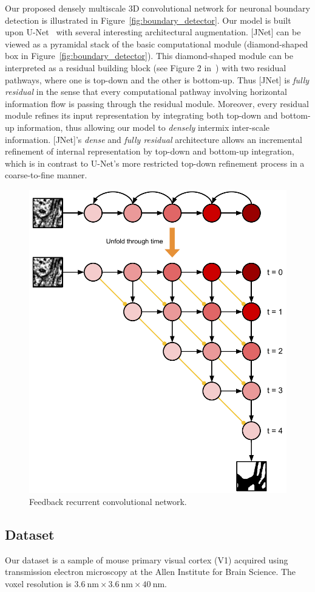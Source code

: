 \documentclass{article}
\begin{document}
\begin{appendices}
Our proposed densely multiscale 3D convolutional network for neuronal boundary
detection is illustrated in Figure~\ref{fig:boundary_detector}. Our model is
built upon U-Net~\cite{unet} with several interesting architectural
augmentation. [JNet] can be viewed as a pyramidal stack of the basic
computational module (diamond-shaped box in Figure~\ref{fig:boundary_detector}).
This diamond-shaped module can be interpreted as a residual building block (see
Figure 2 in~\cite{resnet}) with two residual pathways, where one is top-down and
the other is bottom-up. Thus [JNet] is \emph{fully residual} in the sense that
every computational pathway involving horizontal information flow is passing
through the residual module. Moreover, every residual module refines its input
representation by integrating both top-down and bottom-up information, thus
allowing our model to \emph{densely} intermix inter-scale information. [JNet]'s
\emph{dense} and \emph{fully residual} architecture allows an incremental
refinement of internal representation by top-down and bottom-up integration,
which is in contrast to U-Net's more restricted top-down refinement process in a
coarse-to-fine manner.

\begin{figure}[!t]
\centering
\includegraphics[width=0.6\linewidth]{unfold.pdf}
\caption{Feedback recurrent convolutional network.}
\label{fig:unfold}
\end{figure}

\subsection{Dataset}
Our dataset is a sample of mouse primary visual cortex (V1) acquired using
transmission electron microscopy at the Allen Institute for Brain Science. The
voxel resolution is $3.6~\text{nm} \times 3.6~\text{nm} \times 40~\text{nm}$.


\end{appendices}
\end{document}

